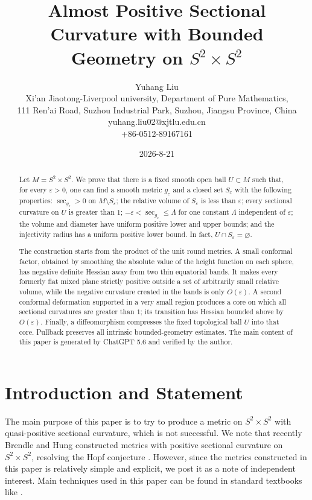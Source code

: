 \documentclass[11pt]{amsart}
\title{Almost Positive Sectional Curvature with Bounded Geometry on $S^2\times S^2$}
\author{Yuhang Liu\\Xi'an Jiaotong-Liverpool university, Department of Pure Mathematics, \\111 Ren'ai Road, Suzhou Industrial Park, Suzhou, Jiangsu Province, China\\yuhang.liu02@xjtlu.edu.cn\\
+86-0512-89167161}
\date{2026-8-21}
\theoremstyle{definition}
\begin{document}
\maketitle

\begin{abstract}
Let $M=S^2\times S^2$.  We prove that there is a fixed smooth open ball $U\subset M$ such that, for every $\varepsilon>0$, one can find a smooth metric $g_\varepsilon$ and a closed set $S_\varepsilon$ with the following properties: $\sec_{g_\varepsilon}>0$ on $M\setminus S_\varepsilon$; the relative volume of $S_\varepsilon$ is less than $\varepsilon$; every sectional curvature on $U$ is greater than $1$; $-\varepsilon<\sec_{g_\varepsilon}\leq\Lambda$ for one constant $\Lambda$ independent of $\varepsilon$; the volume and diameter have uniform positive lower and upper bounds; and the injectivity radius has a uniform positive lower bound.  In fact, $U\cap S_\varepsilon=\varnothing$.

The construction starts from the product of the unit round metrics.  A small conformal factor, obtained by smoothing the absolute value of the height function on each sphere, has negative definite Hessian away from two thin equatorial bands.  It makes every formerly flat mixed plane strictly positive outside a set of arbitrarily small relative volume, while the negative curvature created in the bands is only $O(\varepsilon)$.  A second conformal deformation supported in a very small region produces a core on which all sectional curvatures are greater than $1$; its transition has Hessian bounded above by $O(\varepsilon)$.  Finally, a diffeomorphism compresses the fixed topological ball $U$ into that core.  Pullback preserves all intrinsic bounded-geometry estimates. The main content of this paper is generated by ChatGPT 5.6 and verified by the author.
\end{abstract}

\section{Introduction and Statement}
The main purpose of this paper is to try to produce a metric on $S^2\times S^2$ with quasi-positive sectional curvature, which is not successful. We note that recently Brendle and Hung constructed metrics with positive sectional curvature on $S^2\times S^2$, resolving the Hopf conjecture \cite{Brendle}. However, since the metrics constructed in this paper is relatively simple and explicit, we post it as a note of independent interest. Main techniques used in this paper can be found in standard textbooks like \cite{Klingenberg, Petersen}.
\end{document}
